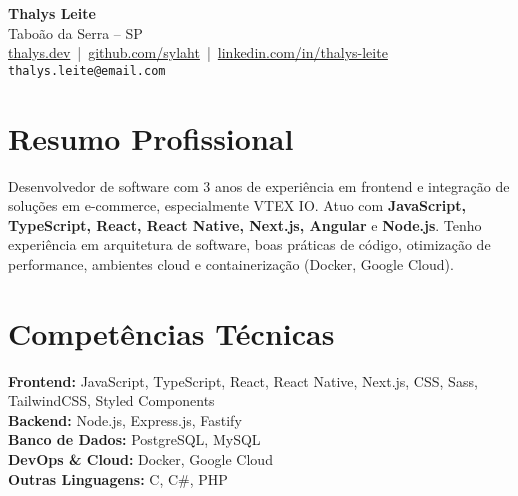 \documentclass[a4paper,10pt]{article}
\begin{document}
\begin{center}
    {\LARGE \textbf{Thalys Leite}}\\[4pt]
    Taboão da Serra – SP \\[2pt]
    \href{https://thalys.dev}{thalys.dev} \,|\, 
    \href{https://github.com/sylaht}{github.com/sylaht} \,|\, 
    \href{https://www.linkedin.com/in/thalys-leite-94a80a234/}{linkedin.com/in/thalys-leite}\\[6pt]
    \texttt{thalys.leite@email.com} %
\end{center}

\vspace{0.4cm}

\section*{Resumo Profissional}
Desenvolvedor de software com 3 anos de experiência em frontend e integração de soluções em e-commerce, especialmente VTEX IO. 
Atuo com \textbf{JavaScript, TypeScript, React, React Native, Next.js, Angular} e \textbf{Node.js}. 
Tenho experiência em arquitetura de software, boas práticas de código, otimização de performance, ambientes cloud e containerização (Docker, Google Cloud).

\section*{Competências Técnicas}
\textbf{Frontend:} JavaScript, TypeScript, React, React Native, Next.js, CSS, Sass, TailwindCSS, Styled Components\\
\textbf{Backend:} Node.js, Express.js, Fastify\\
\textbf{Banco de Dados:} PostgreSQL, MySQL\\
\textbf{DevOps \& Cloud:} Docker, Google Cloud\\
\textbf{Outras Linguagens:} C, C\#, PHP

\end{document}
